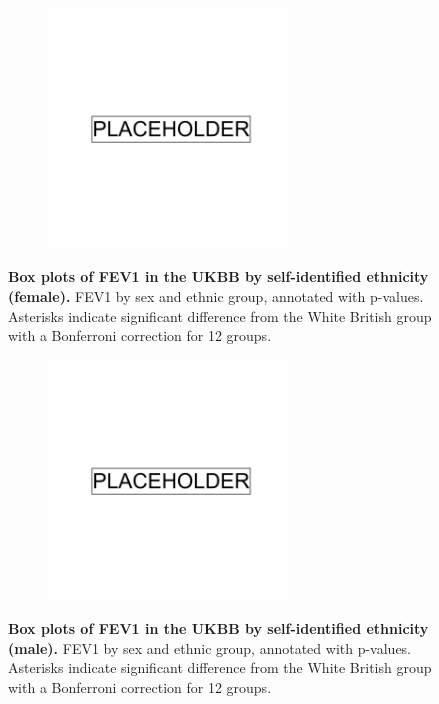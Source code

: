\begin{figure}[ht]
    \centering
    \begin{subfigure}{\textwidth}
    \includegraphics[width=0.7\textwidth]{placeholder.png}
    \end{subfigure}
    \caption[Box plots of FEV1 in the UKBB by self-identified ethnicity (female)]{\textbf{Box plots of FEV1 in the UKBB by self-identified ethnicity (female).} FEV1 by sex and ethnic group, annotated with p-values. Asterisks indicate significant difference from the White British group with a Bonferroni correction for 12 groups.}
    \label{fig:supp_box_fev_f}
\end{figure}

\newpage

\begin{figure}[ht]
    \centering
    \begin{subfigure}{\textwidth}
    \includegraphics[width=0.7\textwidth]{placeholder.png}
    \end{subfigure}
    \caption[Box plots of FEV1 in the UKBB by self-identified ethnicity (male)]{\textbf{Box plots of FEV1 in the UKBB by self-identified ethnicity (male).} FEV1 by sex and ethnic group, annotated with p-values. Asterisks indicate significant difference from the White British group with a Bonferroni correction for 12 groups.}
    \label{fig:supp_box_fev_m}
\end{figure}

